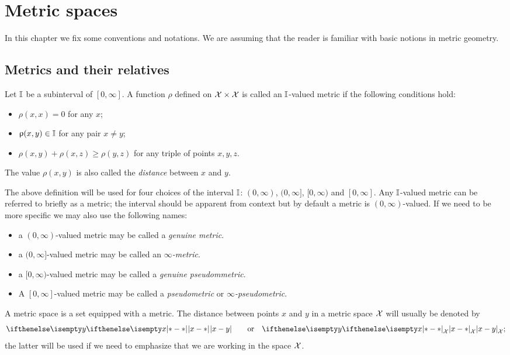 \chapter{Metric spaces}
In this chapter we fix some conventions and notations. We are assuming that the reader is familiar with basic notions in metric geometry.

\section{Metrics and their relatives}
\label{sec:metric spaces}

Let $\mathbb{I}$ be a subinterval of $[0,\infty]$.
A function $\rho$ defined on $\spc{X}\times\spc{X}$ is called an $\mathbb{I}$-valued metric if the following conditions hold:
\begin{itemize}
 \item $\rho(x,x)=0$ for any $x$;
 \item $\rho(x,y)\in \II$ for any pair $x\ne y$;
 \item $\rho(x,y)+\rho(x,z)\ge \rho(y,z)$ for any triple of points $x,y, z$.
\end{itemize}
The value $\rho(x,y)$ is also called the \emph{distance} between $x$ and $y$.


The above definition will be used for four choices of the interval $\mathbb{I}$: $(0,\infty)$, $(0,\infty]$, $[0,\infty)$ and $[0,\infty]$.
Any $\mathbb{I}$-valued metric can be referred to briefly as a metric;
the interval should be apparent from context but by default a metric is $(0,\infty)$-valued. 
If we need to be more specific we may also use the following names:
\begin{itemize}
\item a $(0,\infty)$-valued metric may be called a \emph{genuine metric}.
\item a $(0,\infty]$-valued metric may be called an \emph{$\infty$-metric}.
\item a $[0,\infty)$-valued metric may be called  a \emph{genuine pseudommetric}.
\item A $[0,\infty]$-valued metric may be called a \emph{pseudometric} or \emph{$\infty$-pseudometric}.
\end{itemize}

A metric space is a set equipped with a metric.
The distance between points $x$ and $y$ in a metric space $\mathcal{X}$ will  usually be denoted by \[\dist{x}{y}{}\qquad\text{or}\quad \dist{x}{y}{\spc{X}};\]
the latter will be used if we need to emphasize that we are working in the space $\mathcal{X}$.


